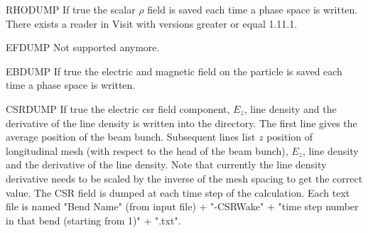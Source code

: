 \begin{kdescription}
  \item[RHODUMP]
  If true the scalar $\rho$ field is saved each time a phase space is written. There exists a reader in Visit with versions
  greater or equal 1.11.1.

  \item[EFDUMP]
  Not supported anymore.

  \item[EBDUMP]
  If true the electric and magnetic field on the particle is saved each time a phase space is written.

  \item[CSRDUMP]
  If true the electric csr field component, $E_z$, line density and the derivative of the line density is written into the  directory.
  The first line gives the average position of the beam bunch.
  Subsequent lines list $z$ position of longitudinal mesh (with respect to the head of the beam bunch),
   $E_z$, line density and the derivative of the line density. Note that currently the line density derivative
   needs to be scaled by the inverse of the mesh spacing to get the correct value. The CSR field
   is dumped at each time step of the calculation. Each text file is named "Bend Name" (from input file) + "-CSRWake" + "time step number in that bend
   (starting from 1)" + ".txt".




\end{kdescription}
